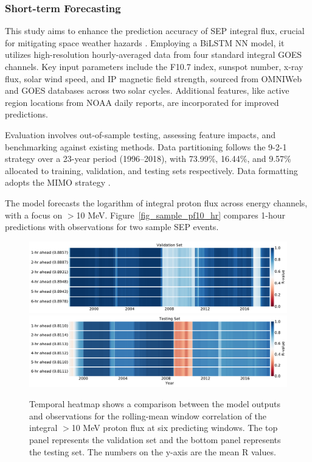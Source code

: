 \subsubsection{Short-term Forecasting}
This study aims to enhance the prediction accuracy of SEP integral flux, crucial for mitigating space weather hazards \citep{mnedal_2023a}. Employing a BiLSTM NN model, it utilizes high-resolution hourly-averaged data from four standard integral GOES channels. Key input parameters include the F10.7 index, sunspot number, x-ray flux, solar wind speed, and IP magnetic field strength, sourced from OMNIWeb and GOES databases across two solar cycles. Additional features, like active region locations from NOAA daily reports, are incorporated for improved predictions.

Evaluation involves out-of-sample testing, assessing feature impacts, and benchmarking against existing methods. Data partitioning follows the 9-2-1 strategy over a 23-year period (1996–2018), with 73.99\%, 16.44\%, and 9.57\% allocated to training, validation, and testing sets respectively. Data formatting adopts the MIMO strategy \citep{benson_2020}.

The model forecasts the logarithm of integral proton flux across energy channels, with a focus on $>$10 MeV. Figure~\ref{fig_sample_pf10_hr} compares 1-hour predictions with observations for two sample SEP events.

\begin{figure}[!htp]
	\centering
	\includegraphics[width=\textwidth]{chapter4/figs/hourly_PF10/temporal_heatmap_val.pdf}
	\includegraphics[width=\textwidth]{chapter4/figs/hourly_PF10/temporal_heatmap_test.pdf}
	\caption{Temporal heatmap shows a comparison between the model outputs and observations for the rolling-mean window correlation of the integral $>$10 MeV proton flux at six predicting windows. The top panel represents the validation set and the bottom panel represents the testing set. The numbers on the y-axis are the mean R values.}
	\label{fig_temp_heatmap_valtest}
\end{figure}


